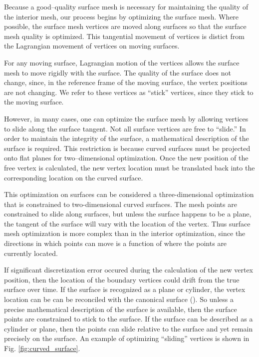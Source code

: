 \documentclass[a4paper,12pt,notitlepage]{article}
\begin{document}
Because a good--quality surface mesh is necessary for maintaining the
quality of the interior mesh, our process begins by optimizing the
surface mesh.  Where possible, the surface mesh vertices are moved
along surfaces so that the surface mesh quality is optimized.  This
tangential movement of vertices is distict from the Lagrangian
movement of vertices on moving surfaces.

For any moving surface, Lagrangian motion of the vertices allows the
surface mesh to move rigidly with the surface. The quality of the
surface does not change, since, in the reference frame of the moving
surface, the vertex positions are not changing.  We refer to these
vertices as ``stick'' vertices, since they stick to the moving surface.

However, in many cases, one can optimize the surface mesh by allowing
vertices to slide along the surface tangent.  Not all surface vertices
are free to ``slide.''  In order to maintain the integrity of
the surface, a mathematical description of the surface is required.
This restriction is because curved surfaces must be projected onto
flat planes for two--dimensional optimization.  Once the new position
of the free vertex is calculated, the new vertex location must be
translated back into the corresponding location on the curved surface.

This optimization on surfaces can be considered a three-dimensional optimization that is constrained to  two-dimensional curved surfaces.  
 The mesh points are constrained to
slide along surfaces, but unless the surface happens to be a plane,
the tangent of the surface will vary with the location of the vertex.
Thus surface mesh optimization is more complex than in the interior optimization, since the directions in which points can move is a function of where the points are currently located.  

If significant discretization error occured during the calculation of
the new vertex position, then the location of the boundary vertices
could drift from the true surface over time.  If the surface is
recognized as a plane or cylinder, the vertex location can be can be reconciled with the
canonical surface (\cite{mesquite:freitag}).  So unless a precise mathematical
description of the surface is available, then the surface points are
constrained to stick to the surface.  If the surface can be described
as a cylinder or plane, then the points can slide relative to the
surface and yet remain precisely on the surface.  An example of
optimizing ``sliding'' vertices is shown in
Fig. \ref{fig:curved_surface}.
\end{document}
